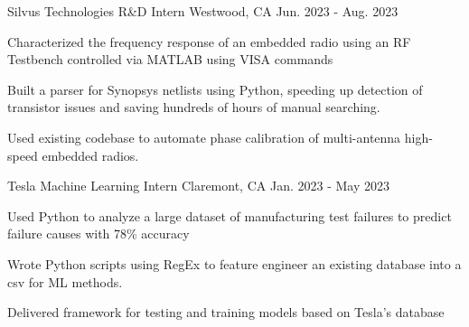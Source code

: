 \begin{cventries}
  \cventry
    {Silvus Technologies} %
    {R\&D Intern} %
    {Westwood, CA} %
    {Jun. 2023 - Aug. 2023} %
    {
      \begin{cvitems} %
        \item {
        Characterized the frequency response of an embedded radio using an RF Testbench controlled via MATLAB using VISA commands
        }
        \item {
        Built a parser for Synopsys netlists using Python, speeding up detection of transistor issues and saving hundreds of hours of manual searching.
        }
        \item {
        Used existing codebase to automate phase calibration of multi-antenna high-speed embedded radios.
        }
      \end{cvitems}
    }

  \cventry
    {Tesla} %
    {Machine Learning Intern} %
    {Claremont, CA} %
    {Jan. 2023 - May 2023} %
    {
      \begin{cvitems} %
        \item {
        Used Python to analyze a large dataset of manufacturing test failures to predict failure causes with 78\% accuracy
        }
        \item{
        Wrote Python scripts using RegEx to feature engineer an existing database into a csv for ML methods.
        }
        \item{
        Delivered framework for testing and training models based on Tesla's database
        }
      \end{cvitems}
    }

\end{cventries}
